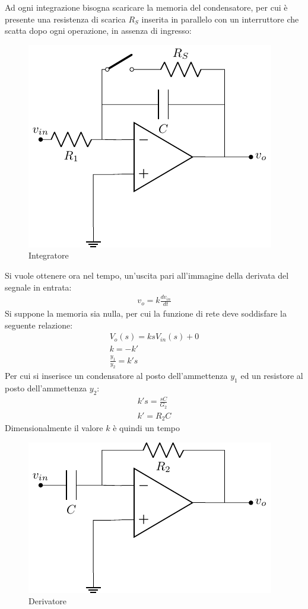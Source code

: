 \documentclass{article}
\numberwithin{equation}{subsection}
\begin{document}
Ad ogni integrazione bisogna scaricare la memoria del condensatore, per cui è presente una resistenza di scarica $R_S$ inserita in parallelo con un 
interruttore che scatta dopo ogni operazione, in assenza di ingresso:
\begin{figure}[H]%
    \centering
    \includegraphics{amplificatore-integratore.pdf}%
    \caption{Integratore}
    \label{amplificatore-integratore}
\end{figure}    


Si vuole ottenere ora nel tempo, un'uscita pari all'immagine della derivata del segnale in entrata:
\begin{gather*}
    v_{o}=k\displaystyle\frac{dv_{in}}{dt}
\end{gather*}
Si suppone la memoria sia nulla, per cui la funzione di rete deve soddisfare la seguente relazione:
\begin{gather*}
    V_o(s)=ksV_{in}(s)+0\\
    k=-k'\\
    \displaystyle\frac{y_1}{y_2}=k's
\end{gather*}
Per cui si inserisce un condensatore al posto dell'ammettenza $y_1$ ed un resistore al posto dell'ammettenza $y_2$:
\begin{gather*}
    k's=\displaystyle\frac{sC}{G_2}\\
    k'=R_2C
\end{gather*}
Dimensionalmente il valore $k$ è quindi un tempo  

\begin{figure}[H]%
    \centering
    \includegraphics{amplificatore-derivatore.pdf}%
    \caption{Derivatore}
    \label{amplificatore-derivatore}
\end{figure}
\end{document}
